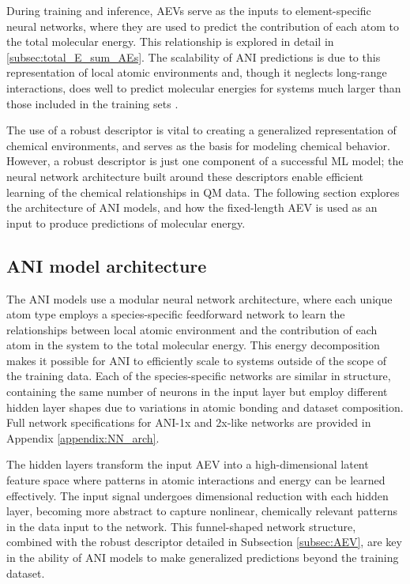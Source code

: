 During training and inference, AEVs serve as the inputs to element-specific neural networks, where they are used to predict the contribution of each atom to the total molecular energy.
This relationship is explored in detail in \ref{subsec:total_E_sum_AEs}.
The scalability of ANI predictions is due to this representation of local atomic environments and, though it neglects long-range interactions, does well to predict molecular energies for systems much larger than those included in the training sets \cite{ani-1x, ani-2x}.

The use of a robust descriptor is vital to creating a generalized representation of chemical environments, and serves as the basis for modeling chemical behavior.
However, a robust descriptor is just one component of a successful ML model; the neural network architecture built around these descriptors enable efficient learning of the chemical relationships in QM data.
The following section explores the architecture of ANI models, and how the fixed-length AEV is used as an input to produce predictions of molecular energy.


\subsection{ANI model architecture}
\label{subsec:ANI_model_arch}

The ANI models use a modular neural network architecture, where each unique atom type employs a species-specific feedforward network to learn the relationships between local atomic environment and the contribution of each atom in the system to the total molecular energy.
This energy decomposition makes it possible for ANI to efficiently scale to systems outside of the scope of the training data. 
Each of the species-specific networks are similar in structure, containing the same number of neurons in the input layer but employ different hidden layer shapes due to variations in atomic bonding and dataset composition.
Full network specifications for ANI-1x and 2x-like networks are provided in Appendix \ref{appendix:NN_arch}.

The hidden layers transform the input AEV into a high-dimensional latent feature space where patterns in atomic interactions and energy can be learned effectively.
The input signal undergoes dimensional reduction with each hidden layer, becoming more abstract to capture nonlinear, chemically relevant patterns in the data input to the network. 
This funnel-shaped network structure, combined with the robust descriptor detailed in Subsection \ref{subsec:AEV}, are key in the ability of ANI models to make generalized predictions beyond the training dataset.

